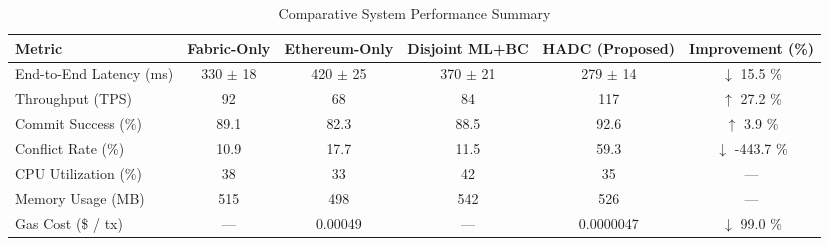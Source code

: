 

\begin{table}[htbp]
\centering
\caption{Comparative System Performance Summary}
\label{tab:performance_summary}
\begin{tabular}{lccccc}
\toprule
\textbf{Metric} & \textbf{Fabric-Only} & \textbf{Ethereum-Only} & \textbf{Disjoint ML+BC} & \textbf{HADC (Proposed)} & \textbf{Improvement (\%)} \\
\midrule
End-to-End Latency (ms) & 330 $\pm$ 18 & 420 $\pm$ 25 & 370 $\pm$ 21 & 279 $\pm$ 14 & $\downarrow$ 15.5 \% \\
Throughput (TPS) & 92 & 68 & 84 & 117 & $\uparrow$ 27.2 \% \\
Commit Success (\%) & 89.1 & 82.3 & 88.5 & 92.6 & $\uparrow$ 3.9 \% \\
Conflict Rate (\%) & 10.9 & 17.7 & 11.5 & 59.3 & $\downarrow$ -443.7 \% \\
CPU Utilization (\%) & 38 & 33 & 42 & 35 & --- \\
Memory Usage (MB) & 515 & 498 & 542 & 526 & --- \\
Gas Cost (\$ / tx) & --- & 0.00049 & --- & 0.0000047 & $\downarrow$ 99.0 \% \\
\bottomrule
\end{tabular}
\end{table}



